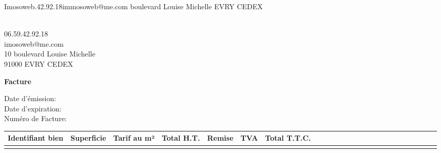 \documentclass{article}
\begin{document}
\begin{raggedleft}
\newline Imosoweb.42.92.18\newline immosoweb@me.com boulevard Louise Michelle EVRY CEDEX
\end{raggedleft}

\begin{flushright}
\nomclient \prenom
\numeroclient
\\06.59.42.92.18
\\imosoweb@me.com
\\10 boulevard Louise Michelle
\\91000 EVRY CEDEX
\end{flushright}

\begin{center}
\president
\textbf{ \huge{Facture}}
\end{center}
\vspace{0.5cm}
\begin{flushleft}
Date d'émission:
\\Date d'expiration:
\\Numéro de Facture:
\end{flushleft}

\vspace { 1cm } 
\begin{center}
\begin{tabular}{|p{3cm}|p{2cm}|p{2cm}|p{2cm}|p{2cm}|p{2cm}|p{2cm}|}
\hline
Identifiant bien & Superficie & Tarif au m² & Total H.T. &Remise &TVA & Total T.T.C.  \\
\hline
& & & & 
& & & &
& & & &
& & & & 
& & & & 
& & & & \\
\hline
\end{tabular}
\end{center}
\end{document}

